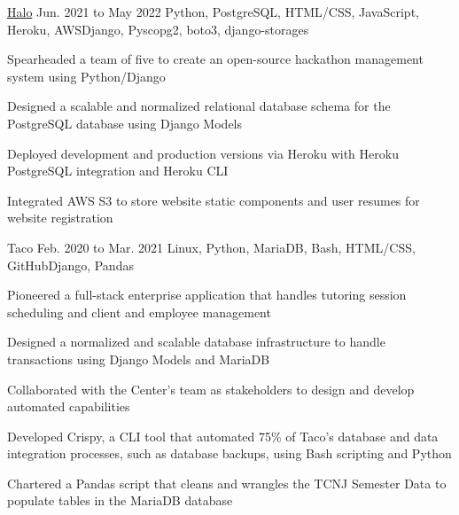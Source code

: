 
\begin{cventry}
    {\href{https://github.com/tcnj-acm/halo}{Halo}}{}
    {Jun. 2021 to May 2022}
    {Python, PostgreSQL, HTML/CSS, JavaScript, Heroku, AWS}{Django, Pyscopg2, boto3, django-storages}
    \begin{cvitems}
        \item Spearheaded a team of five to create an open-source hackathon management system using Python/Django
        \item Designed a scalable and normalized relational database schema for the PostgreSQL database using Django Models
        \item Deployed development and production versions via Heroku with Heroku PostgreSQL integration and Heroku CLI
        \item Integrated AWS S3 to store website static components and user resumes for website registration

    \end{cvitems}
\end{cventry}

 \begin{cventry}
        {Taco}{}
        {Feb. 2020 to Mar. 2021}
        {Linux, Python, MariaDB, Bash, HTML/CSS, GitHub}{Django, Pandas}
        \begin{cvitems}
            \item Pioneered a full-stack enterprise application that handles tutoring session scheduling and client and employee management
            \item Designed a normalized and scalable database infrastructure to handle transactions using Django Models and MariaDB
            \item Collaborated with the Center’s team as stakeholders to design and develop automated capabilities 
            \item Developed Crispy, a CLI tool that automated 75\% of Taco's database and data integration processes, such as database backups, using Bash scripting and Python 
            \item Chartered a Pandas script that cleans and wrangles the TCNJ Semester Data to populate tables in the MariaDB database
        \end{cvitems}  
\end{cventry}    

